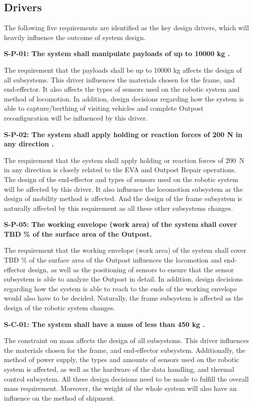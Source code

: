 \subsection{Drivers}
The following five requirements are identified as the key design drivers, which will heavily influence the outcome of system design.

\textbf{S-P-01: The system shall manipulate payloads of up to 10000 \gls{kg} \cite {RFP}.}

The requirement that the payloads shall be up to 10000 \gls{kg} affects the design of all subsystems. This driver influences the materials chosen for the frame, and end-effector. It also affects the types of sensors used on the robotic system and method of locomotion. In addition, design decisions regarding how the system is able to capture/berthing of visiting vehicles and complete Outpost reconfiguration will be influenced by this driver.

\textbf{S-P-02: The system shall apply holding or reaction forces of 200 \gls{N} in any direction \cite{RFP}.}

The requirement that the system shall apply holding or reaction forces of \SI{200}{\N} in any direction is closely related to the EVA and Outpost Repair operations. The design of the end-effector and types of sensors used on the robotic system will be affected by this driver. It also influence the locomotion subsystem as the design of mobility method is affected. And the design of the frame subsystem is naturally affected by this requirement as all these other subsystems changes.

\textbf{S-P-05: The working envelope (work area) of the system shall cover \gls{TBD} \% of the surface area of the Outpost.}

The requirement that the working envelope (work area) of the system shall cover TBD \% of the surface area of the Outpost influences the locomotion and end-effector design, as well as the positioning of sensors to ensure that the sensor subsystem is able to analyze the Outpost in detail. In addition, design decisions regarding how the system is able to reach to the ends of the working envelope would also have to be decided. Naturally, the frame subsystem is affected as the design of the robotic system changes.

\textbf{S-C-01: The system shall have a mass of less than 450 \gls{kg} \cite{RFP}.}

The constraint on mass affects the design of all subsystems. This driver influences the materials chosen for the frame, and end-effector subsystem. Additionally, the method of power supply, the types and amounts of sensors used on the robotic system is affected, as well as the hardware of the data handling, and thermal control subsystem. All these design decisions need to be made to fulfill the overall mass requirement. Moreover, the weight of the whole system will also have an influence on the method of shipment.

